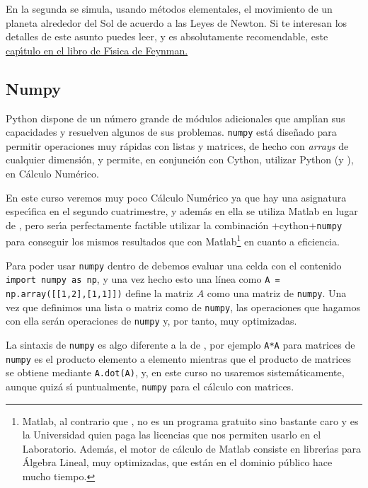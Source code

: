 En la segunda se simula, usando m\'etodos elementales, el movimiento de un
planeta alrededor del Sol de acuerdo a las Leyes de Newton. Si te interesan
los detalles de este asunto puedes leer, y es absolutamente recomendable,  este
\href{http://150.244.21.37/PDFs/MISCE/Feynman-V1-Ch09-Newtons-Laws.pdf}{cap\'{\i}tulo en el libro
de F\'{\i}sica de Feynman.} 






\subsection{Numpy}
Python dispone de un número grande de m\'odulos adicionales que ampl\'{\i}an sus
capacidades y resuelven algunos de sus problemas. \lstinline|numpy| est\'a
dise\~nado
para
permitir operaciones muy r\'apidas con listas y matrices, de hecho con {\itshape
arrays} de cualquier dimensi\'on, y permite, en conjunci\'on con Cython, 
utilizar Python (y {\sage}), en C\'alculo Num\'erico. 

En este curso veremos muy poco C\'alculo Num\'erico ya que hay una asignatura
espec\'{\i}fica en el segundo cuatrimestre, y adem\'as en ella se utiliza Matlab
en lugar de {\sage}, pero ser\'{\i}a perfectamente factible utilizar la
combinaci\'on {\sage}+cython+\lstinline|numpy| para conseguir los mismos
resultados
que con
Matlab\footnote{Matlab, al contrario que {\sage}, no es un programa gratuito
sino bastante caro y es la Universidad quien paga las licencias que nos permiten
usarlo en el Laboratorio. Adem\'as, el motor de c\'alculo de Matlab consiste en 
librer\'{\i}as para \'Algebra Lineal,  muy optimizadas,  que est\'an en el
dominio
p\'ublico hace mucho tiempo.} en cuanto a eficiencia. 

Para poder usar \lstinline|numpy| dentro de {\sage} debemos evaluar una celda
con el
contenido \lstinline|import numpy as np|, y una vez hecho esto una l\'inea como 
\lstinline|A = np.array([[1,2],[1,1]])| define la matriz $A$ como una matriz de
\lstinline|numpy|. Una vez que definimos una lista o matriz como de
\lstinline|numpy|, las
operaciones que hagamos con ella ser\'an operaciones de \lstinline|numpy| y, por
tanto, muy optimizadas.

La sintaxis de \lstinline|numpy| es algo diferente a la de {\sage}, por ejemplo
\lstinline|A*A| para matrices de \lstinline|numpy| es el producto elemento a
elemento
mientras que el producto de matrices se obtiene mediante \lstinline|A.dot(A)|,
y, en este curso no usaremos sistem\'aticamente, aunque quiz\'a s\'{\i}
puntualmente, \lstinline|numpy|  para el c\'alculo con matrices.

